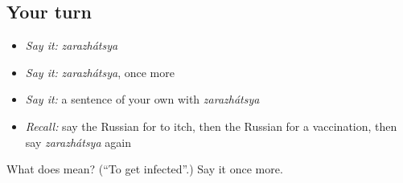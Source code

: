 \subsection*{Your turn}
\begin{itemize}
\raggedright
  \item \emph{Say it:} \emph{zarazhátsya}
  \item \emph{Say it:} \emph{zarazhátsya}, once more
  \item \emph{Say it:} a sentence of your own with \emph{zarazhátsya}
  \item \emph{Recall:} say the Russian for to itch, then the Russian for a vaccination, then say \emph{zarazhátsya} again
\end{itemize}

\begin{tcolorbox}[breakable,colback=teal!4,colframe=teal!35!black,title={Before you move on}]
What does  mean? (\textquotedblleft{}To get infected\textquotedblright{}.) Say it once more.
\end{tcolorbox}
